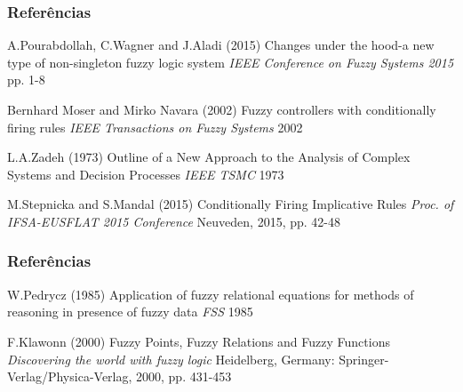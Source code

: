 \documentclass{beamer}
\theoremstyle{definition}
\begin{document}
\begin{frame}
\frametitle{Referências}
\footnotesize{
\begin{thebibliography}{99} %
 A.Pourabdollah, C.Wagner and J.Aladi (2015)
\newblock Changes under the hood-a new type of non-singleton fuzzy logic system
\newblock \emph{IEEE Conference on Fuzzy Systems 2015} pp. 1-8

 Bernhard Moser and Mirko Navara (2002)
\newblock Fuzzy controllers with conditionally firing rules
\newblock \emph{IEEE Transactions on Fuzzy Systems} 2002

 L.A.Zadeh (1973)
\newblock Outline of a New Approach to the Analysis of Complex Systems and Decision Processes
\newblock \emph{IEEE TSMC} 1973

 M.Stepnicka and S.Mandal (2015)
\newblock Conditionally Firing Implicative Rules
\newblock \emph{Proc. of IFSA-EUSFLAT 2015 Conference} Neuveden, 2015, pp. 42-48
\end{thebibliography}
}
\end{frame}

\begin{frame}
\frametitle{Referências}
\footnotesize{
\begin{thebibliography}{99} %
 W.Pedrycz (1985)
\newblock Application of fuzzy relational equations for methods of reasoning in presence of fuzzy data
\newblock \emph{FSS} 1985

 F.Klawonn (2000)
\newblock Fuzzy Points, Fuzzy Relations and Fuzzy Functions
\newblock \emph{Discovering the world with fuzzy logic} Heidelberg, Germany: Springer-Verlag/Physica-Verlag, 2000, pp. 431-453
\end{thebibliography}
}
\end{frame}
\end{document}
